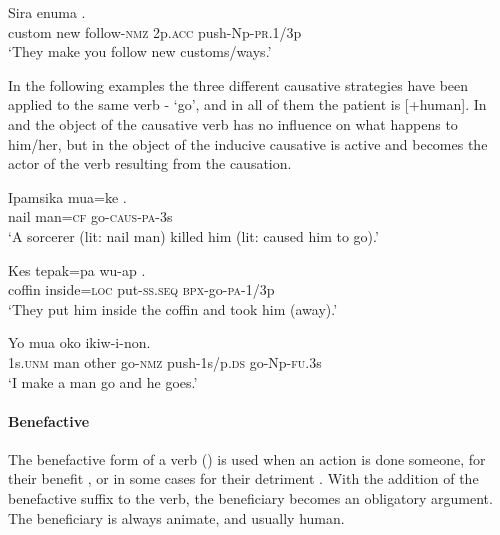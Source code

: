 \ea%
\label{ex:3:x1002}
\gll Sira enuma   . \\
custom new follow-\textsc{nmz} 2p.\textsc{acc} push-Np-\textsc{pr}.1/3p\\
\glt`They make you follow new customs/ways.'
\z

In the following examples the three different causative strategies have been applied to the same verb - `go', and in all of them the patient is [+human]. In  and  the object of the causative verb has no influence on what happens to him/her, but in  the object of the inducive causative is active and becomes the actor of the verb resulting from the causation. 

\ea%
\label{ex:3:x1016}
\gll Ipamsika mua=ke . \\
nail man=\textsc{cf} go-\textsc{caus}-\textsc{pa}-3s \\
\glt`A sorcerer (lit: nail man) killed him (lit: caused him to go).'
\z

\ea%
\label{ex:3:x1829}
\gll Kes tepak=pa wu-ap . \\
coffin inside=\textsc{loc} put-\textsc{ss}.\textsc{seq} \textsc{bpx}-go-\textsc{pa}-1/3p\\
\glt`They put him inside the coffin and took him (away).'
\z

\ea%
\label{ex:3:x1873}
\gll Yo mua oko   ikiw-i-non. \\
1s.\textsc{unm} man other go-\textsc{nmz} push-1s/p.\textsc{ds} go-Np-\textsc{fu}.3s\\
\glt`I make a man go and he goes.'
\z

\paragraph{Benefactive}\label{sec:3.8.4.3.2}
{}
The benefactive form of a verb () is used when an action is done someone, for their benefit , or in some cases for their detriment . With the addition of the benefactive suffix to the verb, the beneficiary becomes an obligatory argument. The beneficiary is always animate, and usually human. 

